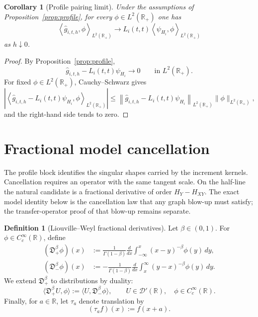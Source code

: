 \documentclass[11pt,a4paper]{amsart}
\theoremstyle{plain}
\newtheorem{corollary}[theorem]{Corollary}
\theoremstyle{definition}
\newtheorem{definition}[theorem]{Definition}
\theoremstyle{remark}
\newcommand{\R}{\mathbb{R}}
\begin{document}
\begin{corollary}[Profile pairing limit]\label{cor:profile-pairing}
Under the assumptions of Proposition~\ref{prop:profile}, for every
$\phi\in L^2(\R_+)$ one has
\begin{equation}\label{eq:profile-pairing-limit}
\left\langle \widehat g_{i,t,h},\phi\right\rangle_{L^2(\R_+)}
\longrightarrow
L_i(t,t)\left\langle \psi_{H_i},\phi\right\rangle_{L^2(\R_+)}
\end{equation}
as $h\downarrow0$.
\end{corollary}

\begin{proof}
By Proposition~\ref{prop:profile},
\[
\widehat g_{i,t,h}-L_i(t,t)\psi_{H_i}\to0
\qquad\text{in }L^2(\R_+).
\]
For fixed \(\phi\in L^2(\R_+)\), Cauchy--Schwarz gives
\[
\left|
\left\langle
\widehat g_{i,t,h}-L_i(t,t)\psi_{H_i},\phi
\right\rangle_{L^2(\R_+)}
\right|
\le
\left\|
\widehat g_{i,t,h}-L_i(t,t)\psi_{H_i}
\right\|_{L^2(\R_+)}
\|\phi\|_{L^2(\R_+)},
\]
and the right-hand side tends to zero.
\end{proof}

\section{Fractional model cancellation}\label{sec:model}

The profile block identifies the singular shapes carried by the increment kernels.  Cancellation
requires an operator with the same tangent scale.  On the half-line the natural candidate is a
fractional derivative of order $H_Y-H_{XY}$.  The exact model identity below is the cancellation law
that any graph blow-up must satisfy; the transfer-operator proof of that blow-up remains separate.

\begin{definition}[Liouville--Weyl fractional derivatives]\label{def:LW}
Let $\beta\in(0,1)$. For $\phi\in C_c^\infty(\R)$, define
\begin{align}
(\mathfrak D_+^\beta \phi)(x)
&:=
\frac{1}{\Gamma(1-\beta)}
\frac{d}{dx}
\int_{-\infty}^x (x-y)^{-\beta}\phi(y)\,dy,
\label{eq:Dplus}\\
(\mathfrak D_-^\beta \phi)(x)
&:=
-\frac{1}{\Gamma(1-\beta)}
\frac{d}{dx}
\int_x^\infty (y-x)^{-\beta}\phi(y)\,dy.
\label{eq:Dminus}
\end{align}
We extend $\mathfrak D_+^\beta$ to distributions by duality:
\begin{equation}\label{eq:Dplus-dual}
\langle \mathfrak D_+^\beta U,\phi\rangle
:=
\langle U,\mathfrak D_-^\beta\phi\rangle,
\qquad
U\in\mathcal D'(\R),\quad \phi\in C_c^\infty(\R).
\end{equation}
Finally, for $a\in\R$, let $\tau_a$ denote translation by
\[
(\tau_a f)(x):=f(x+a).
\]
\end{definition}
\end{document}
